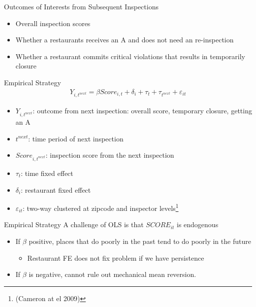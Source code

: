 \documentclass{beamer}
\begin{document}
\begin{frame}{Outcomes of Interests from Subsequent Inspections}
\begin{itemize}
\item Overall inspection scores
\item Whether a restaurants receives an A and does not need an re-inspection
\item Whether a restaurant commits critical violations that results in temporarily closure
\end{itemize}
\end{frame}

\begin{frame}{Empirical Strategy}
    \begin{align*}
        Y_{i,t^{next}} = \beta Score_{i,t} + \delta_i + \tau_{t} + \tau_{t^{next}} + \varepsilon_{it}
    \end{align*}
    \begin{itemize}
    \item $Y_{i,t^{next}}$: outcome from next inspection: overall score, temporary closure, getting an A
    \item $t^{next}$: time period of next inspection
    \item $Score_{i,t^{next}}$: inspection score from the next inspection
    \item $\tau_t$: time fixed effect
    \item $\delta_i$: restaurant fixed effect
    \item $\varepsilon_{it}$: two-way clustered at zipcode and inspector levels\footnote{ (Cameron at el 2009)}
    \end{itemize}
\end{frame}

\begin{frame}{Empirical Strategy}
A challenge of OLS is that $SCORE_{it}$ is endogenous
\begin{itemize}
\item If $\beta$ positive, places that do poorly in the past tend to do poorly in the future
\begin{itemize}
\item Restaurant FE does not fix problem if we have persistence
\end{itemize}
\item If $\beta$ is negative, cannot rule out mechanical mean reversion.  
\end{itemize}
\end{frame}
\end{document}
